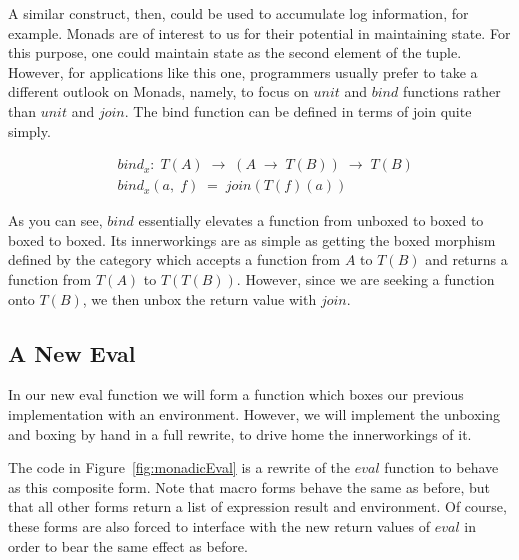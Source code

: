 A similar construct, then, could be used to accumulate log information, for example.
Monads are of interest to us for their potential in maintaining state. For this
purpose, one could maintain state as the second element of the tuple. However, for
applications like this one, programmers usually prefer to take a different outlook on
Monads, namely, to focus on $unit$ and $bind$ functions rather than $unit$ and $join$.
The bind function can be defined in terms of join quite simply.

\begin{figure}[htp]
\caption{}\label{}
\begin{align*}
& bind_{x}: \; T(A) \; \to \; (A \; \to \; T(B)) \; \to \; T(B)
\\& bind_{x}(a, \; f) \; = \; join(T(f)(a))
\end{align*}
\end{figure}

As you can see, $bind$ essentially elevates a function from unboxed to boxed to boxed
to boxed. Its innerworkings are as simple as getting the boxed morphism defined by the
category which accepts a function from $A$ to $T(B)$ and returns a function from $T(A)$
to $T(T(B))$. However, since we are seeking a function onto $T(B)$, we then unbox the
return value with $join$.

\subsection{A New Eval}
In our new eval function we will form a function which boxes our previous
implementation with an environment. However, we will implement the unboxing
and boxing by hand in a full rewrite, to drive home the innerworkings of it.

The code in Figure~\ref{fig:monadicEval} is a rewrite of the $eval$ function to
behave as this composite form. Note that macro forms behave the same as before,
but that all other forms return a list of expression result and environment. Of
course, these forms are also forced to interface with the new return values of
$eval$ in order to bear the same effect as before.

